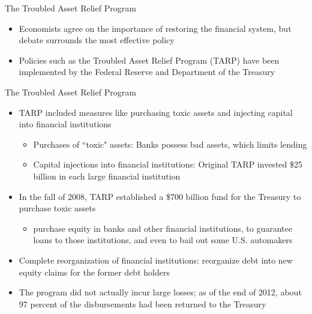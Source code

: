 \documentclass[aspectratio=1610]{beamer}
\begin{document}
\begin{frame}[wide]{The Troubled Asset Relief Program}
	\begin{itemize}
		\item Economists agree on the importance of restoring the financial system, but debate surrounds the most effective policy
		
		\item Policies such as the Troubled Asset Relief Program (TARP) have been implemented by the Federal Reserve and Department of the Treasury

	\end{itemize}
\end{frame}


\begin{frame}[wide]{The Troubled Asset Relief Program}
	\begin{itemize}
		\item TARP included measures like purchasing toxic assets and injecting capital into financial institutions
		\begin{itemize}
			\item Purchases of ``toxic" assets:	Banks possess bad assets, which limits lending
			\item Capital injections into financial institutions: Original TARP invested \$25 billion in each large financial institution
		\end{itemize}
		\item In the fall of 2008, TARP established a \$700 billion fund for the Treasury to purchase toxic assets
		\begin{itemize}
			\item purchase equity in banks and other financial institutions, to guarantee loans to those institutions, and even to bail out some U.S. automakers
		\end{itemize}
		\item Complete reorganization of financial institutions: reorganize debt into new equity claims for the former debt holders
		\item The program did not actually incur large losses; as of the end of 2012, about 97 percent of the disbursements had been returned to the Treasury 
	\end{itemize}
\end{frame}
\end{document}
